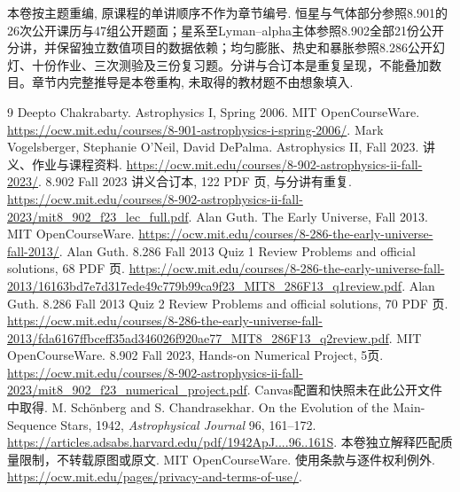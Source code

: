 本卷按主题重编, 原课程的单讲顺序不作为章节编号. 恒星与气体部分参照8.901的26次公开课历与47组公开题面；星系至Lyman--alpha主体参照8.902全部21份公开分讲，并保留独立数值项目的数据依赖；均匀膨胀、热史和暴胀参照8.286公开幻灯、十份作业、三次测验及三份复习题。分讲与合订本是重复呈现，不能叠加数目。章节内完整推导是本卷重构, 未取得的教材题不由想象填入.
\begin{thebibliography}{9}
 Deepto Chakrabarty. Astrophysics I, Spring 2006. MIT OpenCourseWare. \url{https://ocw.mit.edu/courses/8-901-astrophysics-i-spring-2006/}.
 Mark Vogelsberger, Stephanie O'Neil, David DePalma. Astrophysics II, Fall 2023. 讲义、作业与课程资料. \url{https://ocw.mit.edu/courses/8-902-astrophysics-ii-fall-2023/}.
 8.902 Fall 2023 讲义合订本, 122 PDF 页, 与分讲有重复. \url{https://ocw.mit.edu/courses/8-902-astrophysics-ii-fall-2023/mit8_902_f23_lec_full.pdf}.
 Alan Guth. The Early Universe, Fall 2013. MIT OpenCourseWare. \url{https://ocw.mit.edu/courses/8-286-the-early-universe-fall-2013/}.
 Alan Guth. 8.286 Fall 2013 Quiz 1 Review Problems and official solutions, 68 PDF 页. \url{https://ocw.mit.edu/courses/8-286-the-early-universe-fall-2013/16163bd7e7d317ede49c779b99ca9f23_MIT8_286F13_q1review.pdf}.
 Alan Guth. 8.286 Fall 2013 Quiz 2 Review Problems and official solutions, 70 PDF 页. \url{https://ocw.mit.edu/courses/8-286-the-early-universe-fall-2013/fda6167ffbceff35ad346026f920ae77_MIT8_286F13_q2review.pdf}.
 MIT OpenCourseWare. 8.902 Fall 2023, Hands-on Numerical Project, 5页. \url{https://ocw.mit.edu/courses/8-902-astrophysics-ii-fall-2023/mit8_902_f23_numerical_project.pdf}. Canvas配置和快照未在此公开文件中取得.
 M. Schönberg and S. Chandrasekhar. On the Evolution of the Main-Sequence Stars, 1942, \emph{Astrophysical Journal} 96, 161--172. \url{https://articles.adsabs.harvard.edu/pdf/1942ApJ....96..161S}. 本卷独立解释匹配质量限制，不转载原图或原文.
 MIT OpenCourseWare. 使用条款与逐件权利例外. \url{https://ocw.mit.edu/pages/privacy-and-terms-of-use/}.
\end{thebibliography}
